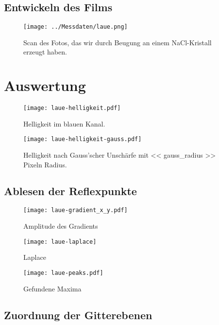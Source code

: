 \subsection{Entwickeln des Films}

\begin{figure}[htbp]
    \centering
    \texttt{[image: ../Messdaten/laue.png]}
    \caption{%
        Scan des Fotos, das wir durch Beugung an einem NaCl-Kristall erzeugt
        haben.
    }
    \label{fig:Laue}
\end{figure}

\section{Auswertung}

\begin{figure}[htbp]
    \centering
    \texttt{[image: laue-helligkeit.pdf]}
    \caption{%
        Helligkeit im blauen Kanal.
    }
    \label{fig:}
\end{figure}

\begin{figure}[htbp]
    \centering
    \texttt{[image: laue-helligkeit-gauss.pdf]}
    \caption{%
        Helligkeit nach Gauss'scher Unschärfe mit << gauss_radius >> Pixeln
        Radius.
    }
    \label{fig:}
\end{figure}

\subsection{Ablesen der Reflexpunkte}

\begin{figure}[htbp]
    \centering
    \texttt{[image: laue-gradient\_x\_y.pdf]}
    \caption{%
        Amplitude des Gradients
    }
    \label{fig:}
\end{figure}

\begin{figure}[htbp]
    \centering
    \texttt{[image: laue-laplace]}
    \caption{%
        Laplace
    }
    \label{fig:}
\end{figure}

\begin{figure}[htbp]
    \centering
    \texttt{[image: laue-peaks.pdf]}
    \caption{%
        Gefundene Maxima
    }
    \label{fig:}
\end{figure}

\subsection{Zuordnung der Gitterebenen}

